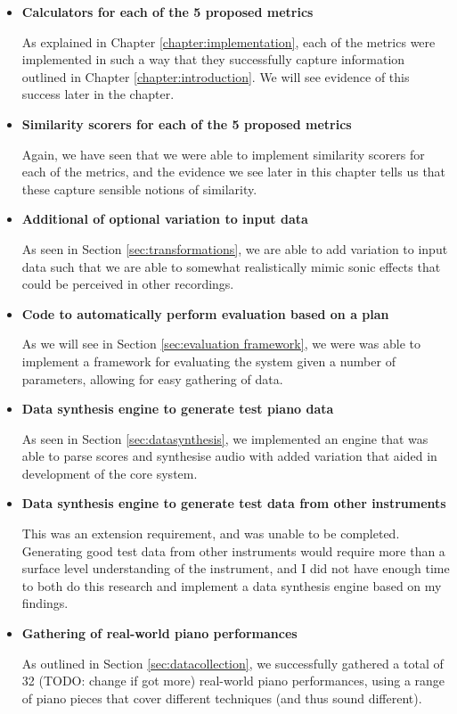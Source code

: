 \documentclass[oneside, class=book, 12pt, crop=false]{standalone}
\begin{document}
\begin{itemize}
  \item
    \textbf{Calculators for each of the 5 proposed metrics}

    As explained in Chapter \ref{chapter:implementation}, each of the metrics were implemented in such a way that they successfully capture information outlined in Chapter \ref{chapter:introduction}. We will see evidence of this success later in the chapter.

  \item
    \textbf{Similarity scorers for each of the 5 proposed metrics}

    Again, we have seen that we were able to implement similarity scorers for each of the metrics, and the evidence we see later in this chapter tells us that these capture sensible notions of similarity.

  \item
    \textbf{Additional of optional variation to input data}

    As seen in Section \ref{sec:transformations}, we are able to add variation to input data such that we are able to somewhat realistically mimic sonic effects that could be perceived in other recordings.

  \item
    \textbf{Code to automatically perform evaluation based on a plan}

    As we will see in Section \ref{sec:evaluation framework}, we were was able to implement a framework for evaluating the system given a number of parameters, allowing for easy gathering of data.

  \item
    \textbf{Data synthesis engine to generate test piano data}

    As seen in Section \ref{sec:datasynthesis}, we implemented an engine that was able to parse scores and synthesise audio with added variation that aided in development of the core system.

  \item
    \textbf{Data synthesis engine to generate test data from other instruments}

    This was an extension requirement, and was unable to be completed. Generating good test data from other instruments would require more than a surface level understanding of the instrument, and I did not have enough time to both do this research and implement a data synthesis engine based on my findings.

  \item
    \textbf{Gathering of real-world piano performances}

    As outlined in Section \ref{sec:datacollection}, we successfully gathered a total of 32 (TODO: change if got more) real-world piano performances, using a range of piano pieces that cover different techniques (and thus sound different).
\end{itemize}
\end{document}
